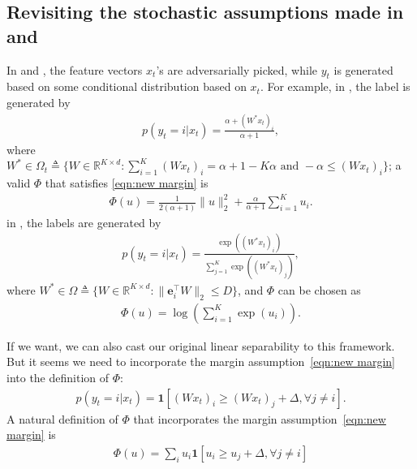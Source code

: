 \documentclass{article}
\newcommand{\one}{\boldsymbol{1}}
\newcommand{\e}{\mathbf{e}}
\begin{document}
\subsection{Revisiting the stochastic assumptions made in \cite{crammer2013multiclass} and \cite{agarwal2013selective}}
In \cite{crammer2013multiclass} and \cite{agarwal2013selective}, the feature vectors $x_t$'s are adversarially picked, while $y_t$ is generated based on some conditional distribution based on $x_t$. For example, in \cite{crammer2013multiclass}, the label is generated by
\begin{align}
    p(y_t = i | x_t) = \frac{\alpha + (W^*x_t)_i}{\alpha+1}, \label{eqn:confidit assumption}
\end{align}
where $W^* \in \Omega_t \triangleq \{W\in \mathbb{R}^{K\times d}: \sum_{i=1}^K (Wx_t)_i = \alpha+1-K\alpha \text{\ and\ } -\alpha \leq (Wx_t)_i\}$; a valid $\Phi$ that satisfies \eqref{eqn:new margin} is 
\begin{align}
    \Phi(u) = \frac{1}{2(\alpha+1)}\|u\|_2^2 + \frac{\alpha}{\alpha+1}\sum_{i=1}^K u_i. 
\end{align}
in \cite{agarwal2013selective}, the labels are generated by 
\begin{align}
    p(y_t = i | x_t) = \frac{\exp((W^*x_t)_i)}{\sum_{j=1}^K \exp((W^*x_t)_j) },
\end{align}
where $W^* \in \Omega \triangleq \{W\in \mathbb{R}^{K\times d}: \|\e_i^\top W\|_2 \leq D \}$, and $\Phi$ can be chosen as
\begin{align}
    \Phi(u) = \log\left(\sum_{i=1}^K \exp(u_i) \right). 
\end{align}

If we want, we can also cast our original linear separability to this framework. But it seems we need to incorporate the margin assumption~\eqref{eqn:new margin} into the definition of $\Phi$: 
\begin{align}
    p(y_t=i|x_t) = \one\left[(Wx_t)_i \geq (Wx_t)_j + \Delta, \forall j\neq i\right]. 
\end{align}
A natural definition of $\Phi$ that incorporates the margin assumption~\eqref{eqn:new margin} is
\begin{align}
    \Phi(u) = \sum_i u_i\one[u_i\geq u_j+\Delta, \forall j\neq i] 
\end{align}
\end{document}
